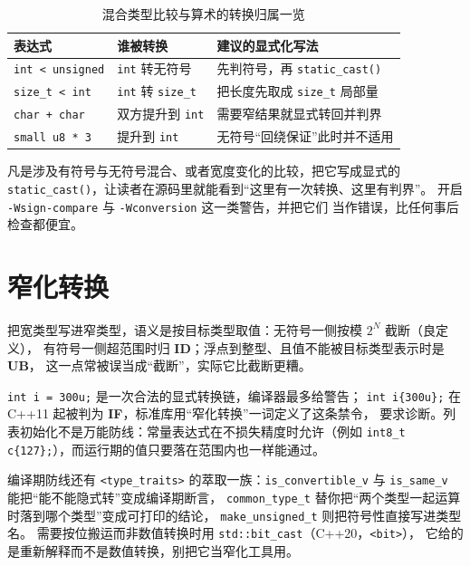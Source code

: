 \documentclass[12pt,a4paper,fontset=fandol]{ctexbook}
\newcommand{\cpp}[1]{C++#1}
\newcommand{\Fn}[1]{\texttt{#1()}}
\newcommand{\Tp}[1]{\texttt{#1}}
\newcommand{\Bk}{\discretionary{}{}{}}
\newcommand{\UB}{\textbf{\textsf{UB}}}
\newcommand{\IDB}{\textbf{\textsf{ID}}}
\newcommand{\ILLF}{\textbf{\textsf{IF}}}
\newcommand{\Hdr}[1]{\texttt{<#1>}}
\begin{document}
\begin{table}
\centering
\begin{tabularx}{0.78\textwidth}{@{}>{\raggedright\arraybackslash}p{} >{\raggedright\arraybackslash}p{} >{\raggedright\arraybackslash}X@{}}
\toprule
表达式 & 谁被转换 & 建议的显式化写法 \\
\midrule
\Tp{int < unsigned} & \Tp{int} 转无符号 & 先判符号，再 \Fn{static\_cast} \\
\Tp{size\_t < int} & \Tp{int} 转 \Tp{size\_t} & 把长度先取成 \Tp{size\_t} 局部量 \\
\Tp{char + char} & 双方提升到 \Tp{int} & 需要窄结果就显式转回并判界 \\
\Tp{small u8 * 3} & 提升到 \Tp{int} & 无符号“回绕保证”此时并不适用 \\
\bottomrule
\end{tabularx}
\caption{混合类型比较与算术的转换归属一览}
\label{tab:ub09-convert}
\end{table}

\begin{guideline}[title={转换要么隐式无害，要么显式写清}]
凡是涉及有符号与无符号混合、或者宽度变化的比较，把它写成显式的
\Fn{static\_cast}，让读者在源码里就能看到“这里有一次转换、这里有判界”。
开启 \Tp{-Wsign-{\Bk}compare} 与 \Tp{-Wconversion} 这一类警告，并把它们
当作错误，比任何事后检查都便宜。
\end{guideline}

\section{窄化转换}\label{sec:ub09-narrow}

把宽类型写进窄类型，语义是按目标类型取值：无符号一侧按模 $2^N$ 截断（良定义），
有符号一侧超范围时归 \IDB{}；浮点到整型、且值不能被目标类型表示时是 \UB{}，
这一点常被误当成“截断”，实际它比截断更糟。

\begin{compare}[title={拷贝初始化与列表初始化的分工}]
\Tp{int i = 300u;} 是一次合法的显式转换链，编译器最多给警告；
\Tp{int i\{300u\};} 在 \cpp{11} 起被判为 \ILLF{}，标准库用“窄化转换”一词定义了这条禁令，
要求诊断。列表初始化不是万能防线：常量表达式在不损失精度时允许（例如
\Tp{int8\_t c\{127\};}），而运行期的值只要落在范围内也一样能通过。
\end{compare}

编译期防线还有 \Hdr{type\_traits} 的萃取一族：\Tp{is{\Bk}\_convertible{\Bk}\_v}
与 \Tp{is{\Bk}\_same{\Bk}\_v} 能把“能不能隐式转”变成编译期断言，
\Tp{common{\Bk}\_type{\Bk}\_t} 替你把“两个类型一起运算时落到哪个类型”变成可打印的结论，
\Tp{make{\Bk}\_unsigned{\Bk}\_t} 则把符号性直接写进类型名。
需要按位搬运而非数值转换时用 \Tp{std::bit{\Bk}\_cast}（\cpp{20}，\Hdr{bit}），
它给的是重新解释而不是数值转换，别把它当窄化工具用。
\end{document}
